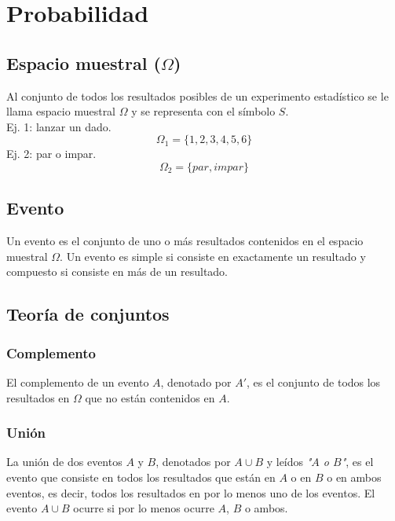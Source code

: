 \documentclass{report}
\begin{document}
  \chapter*{Probabilidad}
    
    \section*{Espacio muestral ($\Omega$)}
      Al conjunto de todos los resultados posibles de un experimento estadístico 
      se le llama espacio muestral $\Omega$ y se representa con el símbolo $S$.\\
      \indent Ej. 1: lanzar un dado.
      \begin{equation*}
        \Omega_1=\{1, 2, 3, 4, 5, 6\}
      \end{equation*}
      \indent Ej. 2: par o impar.
      \begin{equation*}
        \Omega_2=\{par, impar\}
      \end{equation*}
    \section*{Evento}
    Un evento es el conjunto de uno o más resultados contenidos en el espacio 
    muestral $\Omega$. Un evento es simple si consiste en exactamente un resultado y 
    compuesto si consiste en más de un resultado.

    \section*{Teoría de conjuntos}

      \subsection*{Complemento}
      El complemento de un evento $A$, denotado por $A'$, es el conjunto de todos los 
      resultados en $\Omega$ que no están contenidos en $A$. 

      \subsection*{Unión}
      La unión de dos eventos $A$ y $B$, denotados por $A\cup B$ y leídos \textit{"$A$ o $B$"}, 
      es el evento que consiste en todos los resultados que están en $A$ o en $B$ 
      o en ambos eventos, es decir, todos  los resultados en por lo menos uno de 
      los eventos. El evento $A\cup B$ ocurre si por lo menos ocurre $A$, $B$ 
      o ambos.
\end{document}

